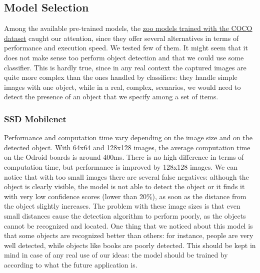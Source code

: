 \documentclass[10pt,conference,compsocconf]{IEEEtran}
\begin{document}
\subsection{Model Selection}
Among the available pre-trained models, the \href{https://github.com/tensorflow/models/blob/master/research/object\_detection/g3doc/detection_model_zoo.md}{zoo models trained with the COCO dataset} caught our attention, since they offer several alternatives in terms of performance and execution speed. We tested few of them.
It might seem that it does not make sense too perform object detection and that we could use some classifier. This is hardly true, since in any real context the captured images are quite more complex than the ones handled by classifiers: they handle simple images with one object, while in a real, complex, scenarios, we would need to detect the presence of an object that we specify among a set of items.
\subsubsection{SSD Mobilenet}
\label{model:ssd}
Performance and computation time vary depending on the image size and on the detected object.
With 64x64 and 128x128 images, the average computation time on the Odroid boards is around 400ms. There is no high difference in terms of computation time, but performance is improved by 128x128 images. We can notice that with too small images there are several false negatives: although the object is clearly visible, the model is not able to detect the object or it finds it with very low confidence scores (lower than 20\%), as soon as the distance from the object slightly increases. The problem with these image sizes is that even small distances cause the detection algorithm to perform poorly, as the objects cannot be recognized and located.
One thing that we noticed about this model is that some objects are recognized better than others: for instance, people are very well detected, while objects like books are poorly detected. This should be kept in mind in case of any real use of our ideas: the model should be trained by according to what the future application is.
\end{document}
